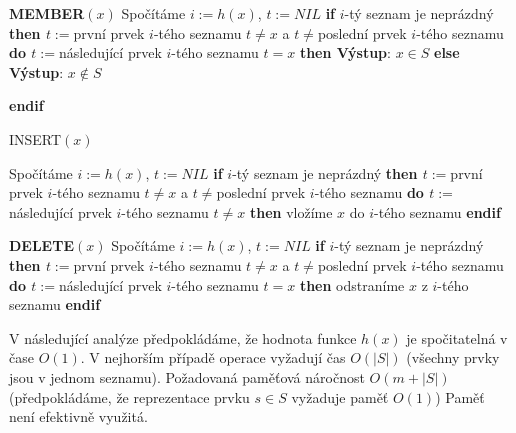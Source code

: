 \documentclass[a4paper,12pt]{article}
\begin{document}
{\bf MEMBER$(x)$}\newline 
Spočítáme $i:=h(x)$, $t:=NIL$\newline 
{\bf if} $i$-tý seznam je neprázdný {\bf then\newline 
\phantom{{\rm ---}}$t:=$}první prvek $i$-tého seznamu\newline 
\phantom{---}{\bf while} $t\ne x$ a $t\ne$poslední prvek $i$-tého seznamu {\bf do\newline 
\phantom{{\rm ------}}$t:=$}následující prvek $i$-tého seznamu\newline 
\phantom{---}{\bf enddo\newline 
endif\newline 
if} $t=x$ {\bf then Výstup}: $x\in S$ {\bf else Výstup}: $x\notin 
S$ {\bf endif

INSERT$(x)$}\newline 
Spočítáme $i:=h(x)$, $t:=NIL$\newline 
{\bf if} $i$-tý seznam je neprázdný {\bf then\newline 
\phantom{{\rm ---}}$t:=$}první prvek $i$-tého seznamu\newline 
\phantom{---}{\bf while} $t\ne x$ a $t\ne$poslední prvek $i$-tého seznamu {\bf do\newline 
\phantom{{\rm ------}}$t:=$}následující prvek $i$-tého seznamu\newline 
\phantom{---}{\bf enddo\newline 
endif\newline 
if} $t\ne x$ {\bf then} vložíme $x$ do $i$-tého seznamu {\bf endif}

{\bf DELETE}$(x)$\newline 
Spočítáme $i:=h(x)$, $t:=NIL$\newline 
{\bf if} $i$-tý seznam je neprázdný {\bf then\newline 
\phantom{{\rm ---}}$t:=$}první prvek $i$-tého seznamu\newline 
\phantom{---}{\bf while} $t\ne x$ a $t\ne$poslední prvek $i$-tého seznamu {\bf do\newline 
\phantom{{\rm ------}}$t:=$}následující prvek $i$-tého seznamu\newline 
\phantom{---}{\bf enddo\newline 
endif\newline 
if} $t=x$ {\bf then} odstraníme $x$ z $i$-tého seznamu {\bf endif}

V následující analýze předpokládáme, že hodnota funkce $
h(x)$ 
je spočitatelná v čase $O(1)$.\newline 
V nejhorším případě operace vyžadují čas $
O(|S|)$ 
(všechny prv\-ky jsou v jednom seznamu). \newline 
Požadovaná paměťová náročnost $O(m+|S|)$ 
(předpokládáme, že reprezentace prvku $s\in S$ vyžaduje paměť $
O(1)$)\newline 
Paměť není efektivně využitá.
\end{document}
